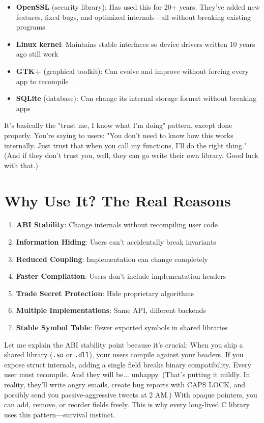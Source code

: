 \begin{itemize}
    \item \textbf{OpenSSL} (security library): Has used this for 20+ years. They've added new features, fixed bugs, and optimized internals---all without breaking existing programs
    \item \textbf{Linux kernel}: Maintains stable interfaces so device drivers written 10 years ago still work
    \item \textbf{GTK+} (graphical toolkit): Can evolve and improve without forcing every app to recompile
    \item \textbf{SQLite} (database): Can change its internal storage format without breaking apps
\end{itemize}

It's basically the "trust me, I know what I'm doing" pattern, except done properly. You're saying to users: "You don't need to know how this works internally. Just trust that when you call my functions, I'll do the right thing." (And if they don't trust you, well, they can go write their own library. Good luck with that.)

\section{Why Use It? The Real Reasons}

\begin{enumerate}
    \item \textbf{ABI Stability}: Change internals without recompiling user code
    \item \textbf{Information Hiding}: Users can't accidentally break invariants
    \item \textbf{Reduced Coupling}: Implementation can change completely
    \item \textbf{Faster Compilation}: Users don't include implementation headers
    \item \textbf{Trade Secret Protection}: Hide proprietary algorithms
    \item \textbf{Multiple Implementations}: Same API, different backends
    \item \textbf{Stable Symbol Table}: Fewer exported symbols in shared libraries
\end{enumerate}

Let me explain the ABI stability point because it's crucial: When you ship a shared library (\texttt{.so} or \texttt{.dll}), your users compile against your headers. If you expose struct internals, adding a single field breaks binary compatibility. Every user must recompile. And they will be... unhappy. (That's putting it mildly. In reality, they'll write angry emails, create bug reports with CAPS LOCK, and possibly send you passive-aggressive tweets at 2 AM.) With opaque pointers, you can add, remove, or reorder fields freely. This is why every long-lived C library uses this pattern---survival instinct.


